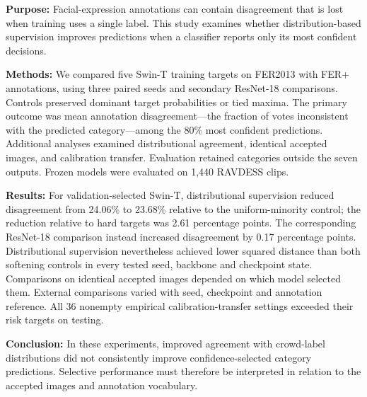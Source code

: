 \noindent\textbf{Purpose:} Facial-expression annotations can contain disagreement that is lost when training uses a single label. This study examines whether distribution-based supervision improves predictions when a classifier reports only its most confident decisions.
\par\smallskip
\noindent\textbf{Methods:} We compared five Swin-T training targets on FER2013 with FER+ annotations, using three paired seeds and secondary ResNet-18 comparisons. Controls preserved dominant target probabilities or tied maxima. The primary outcome was mean annotation disagreement---the fraction of votes inconsistent with the predicted category---among the 80\% most confident predictions. Additional analyses examined distributional agreement, identical accepted images, and calibration transfer. Evaluation retained categories outside the seven outputs. Frozen models were evaluated on 1,440 RAVDESS clips.
\par\smallskip
\noindent\textbf{Results:} For validation-selected Swin-T, distributional supervision reduced disagreement from 24.06\% to 23.68\% relative to the uniform-minority control; the reduction relative to hard targets was 2.61 percentage points. The corresponding ResNet-18 comparison instead increased disagreement by 0.17 percentage points. Distributional supervision nevertheless achieved lower squared distance than both softening controls in every tested seed, backbone and checkpoint state. Comparisons on identical accepted images depended on which model selected them. External comparisons varied with seed, checkpoint and annotation reference. All 36 nonempty empirical calibration-transfer settings exceeded their risk targets on testing.
\par\smallskip
\noindent\textbf{Conclusion:} In these experiments, improved agreement with crowd-label distributions did not consistently improve confidence-selected category predictions. Selective performance must therefore be interpreted in relation to the accepted images and annotation vocabulary.
